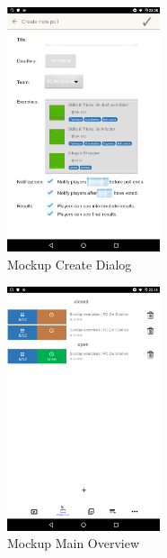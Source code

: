 \begin{figure}[H]
    \begin{center}
        \includegraphics[width=0.4\textwidth]{images/mockups/create.png}
        \caption{Mockup Create Dialog}
        \label{fig:mockup_create}
    \end{center}
\end{figure}

\begin{figure}[H]
    \begin{center}
        \includegraphics[width=0.4\textwidth]{images/mockups/main-active.png}
        \caption{Mockup Main Overview}
        \label{fig:mockup_main}
    \end{center}
\end{figure}


